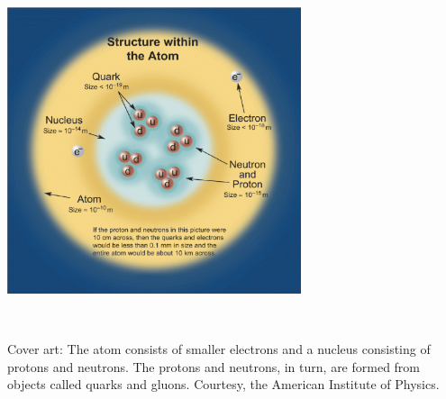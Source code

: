 \documentclass[twoside]{article}
\newcounter{activity}
\begin{document}
\begin{center}

\includegraphics[width=3.4in]{AtomicStructure.ps}

\end{center}

\thispagestyle{empty}

\newpage


\ 
\setcounter{page}{1}

\vfill

Cover art: The atom consists of smaller electrons and a nucleus consisting of protons and neutrons.
The protons and neutrons, in turn, are formed from objects called quarks and gluons.
Courtesy, the American Institute of Physics.

\pagebreak

\tableofcontents{}

\newpage

\setcounter{page}{3}

\thispagestyle{plain}

\vfill

\ 

\pagebreak

\setcounter{activity}{0}


\setcounter{activity}{0}


\setcounter{activity}{0}


\setcounter{activity}{0}


\setcounter{activity}{0}


\setcounter{activity}{0}


\setcounter{activity}{0}


\setcounter{activity}{0}












\end{document}
